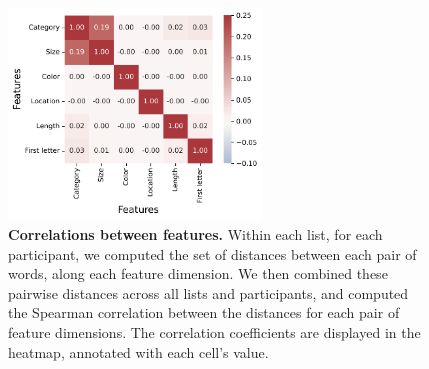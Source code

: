 \documentclass{article}
\begin{document}
    \begin{figure}[tp] \centering
        \includegraphics[width=0.6\textwidth]{figures/feature_correlations}
        
        \caption{\textbf{Correlations between features.} Within each list, for each participant, we
        computed the set of distances between each pair of words, along each feature dimension.  We
        then combined these pairwise distances across all lists and participants, and computed the
        Spearman correlation between the distances for each pair of feature dimensions.  The correlation
        coefficients are displayed in the heatmap, annotated with each cell's value.} \label{fig:feature-correlations}
        
        \end{figure}




%
%
\end{document}
